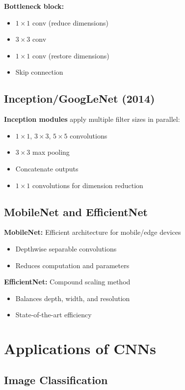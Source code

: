 \textbf{Bottleneck block:}
\begin{itemize}
    \item $1 \times 1$ conv (reduce dimensions)
    \item $3 \times 3$ conv
    \item $1 \times 1$ conv (restore dimensions)
    \item Skip connection
\end{itemize}

\subsection{Inception/GoogLeNet (2014)}

\textbf{Inception modules} apply multiple filter sizes in parallel:
\begin{itemize}
    \item $1 \times 1$, $3 \times 3$, $5 \times 5$ convolutions
    \item $3 \times 3$ max pooling
    \item Concatenate outputs
    \item $1 \times 1$ convolutions for dimension reduction
\end{itemize}

\subsection{MobileNet and EfficientNet}

\textbf{MobileNet:} Efficient architecture for mobile/edge devices
\begin{itemize}
    \item Depthwise separable convolutions
    \item Reduces computation and parameters
\end{itemize}

\textbf{EfficientNet:} Compound scaling method
\begin{itemize}
    \item Balances depth, width, and resolution
    \item State-of-the-art efficiency
\end{itemize}

\section{Applications of CNNs}
\label{sec:cnn-applications}

\subsection{Image Classification}

